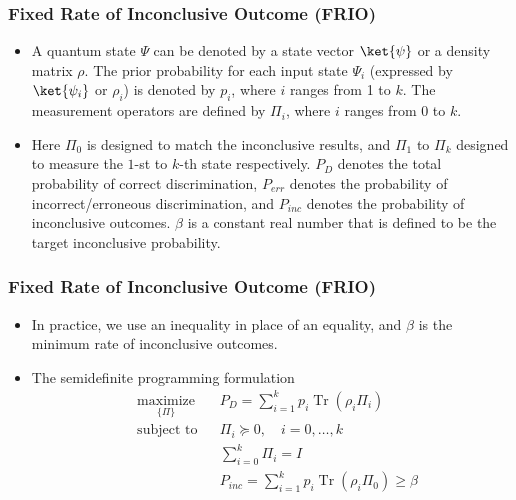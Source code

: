 \documentclass{beamer}
\begin{document}
\begin{frame}[label=frame4]
  \frametitle{Fixed Rate of Inconclusive Outcome (FRIO)}
  \begin{itemize}
    \item A quantum state $\Psi$ can be denoted by a state vector $\ket{\psi}$ or a density matrix $\rho$.
          The prior probability for each input state $\Psi_{i}$ (expressed by $\ket{\psi_{i}}$ or $\rho_{i}$) is
          denoted by $p_{i}$, where $i$ ranges from 1 to $k$.
          The measurement operators are defined by $\Pi_{i}$, where $i$ ranges from 0 to $k$.
    \item Here $\Pi_{0}$ is designed to match the inconclusive results,
          and $\Pi_{1}$ to $\Pi_{k}$ designed to measure the $1$-st to $k$-th state respectively.
          $P_{D}$ denotes the total probability of correct discrimination,
          $P_{err}$ denotes the probability of incorrect/erroneous discrimination,
          and $P_{inc}$ denotes the probability of inconclusive outcomes.
          $\beta$ is a constant real number that is defined to be the target inconclusive probability.
  \end{itemize}

\end{frame}

\begin{frame}
  \frametitle{Fixed Rate of Inconclusive Outcome (FRIO)}
  \begin{itemize}
    \item In practice, we use an inequality in place of an equality,
          and $\beta$ is the minimum rate of inconclusive outcomes.
    \item The semidefinite programming formulation
          \begin{align}
             & \underset{\{\Pi\}}{\text{maximize}} &  & P_{D}=\sum_{i=1}^{k} p_{i} \operatorname{Tr}(\rho_{i} \Pi_{i})              \\
             & \text{subject to}                   &  & \Pi_{i} \succeq 0, \quad i = 0, \ldots, k                                   \\
             &                                     &  & \sum_{i=0}^{k} \Pi_i = I                                                    \\
             &                                     &  & P_{inc}=\sum_{i=1}^{k} p_{i} \operatorname{Tr}(\rho_{i} \Pi_{0}) \geq \beta
          \end{align}
  \end{itemize}
\end{frame}
\end{document}
